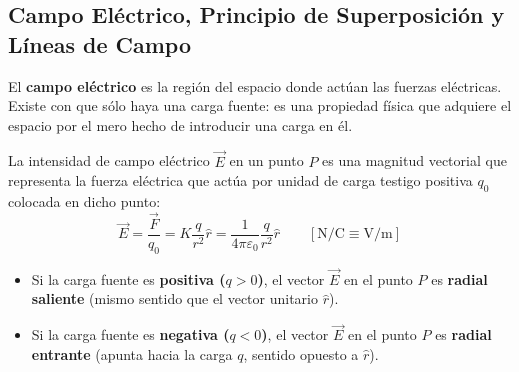 \subsection{Campo Eléctrico, Principio de Superposición y Líneas de Campo}

El \textbf{campo eléctrico} es la región del espacio donde actúan las fuerzas eléctricas. Existe con que sólo haya una carga fuente: es una propiedad física que adquiere el espacio por el mero hecho de introducir una carga en él.

\begin{definicion}
La intensidad de campo eléctrico $\vec{E}$ en un punto $P$ es una magnitud vectorial que representa la fuerza eléctrica que actúa por unidad de carga testigo positiva $q_0$ colocada en dicho punto:
\begin{equation}
    \vec{E} = \frac{\vec{F}}{q_0} = K \frac{q}{r^2} \hat{r} = \frac{1}{4\pi\varepsilon_0} \frac{q}{r^2} \hat{r} \qquad \left[\si{\newton\per\coulomb} \equiv \si{\volt\per\meter}\right]
\end{equation}
\begin{itemize}[leftmargin=*]
    \item Si la carga fuente es \textbf{positiva ($q > 0$)}, el vector $\vec{E}$ en el punto $P$ es \textbf{radial saliente} (mismo sentido que el vector unitario $\hat{r}$).
    \item Si la carga fuente es \textbf{negativa ($q < 0$)}, el vector $\vec{E}$ en el punto $P$ es \textbf{radial entrante} (apunta hacia la carga $q$, sentido opuesto a $\hat{r}$).
\end{itemize}
\end{definicion}

